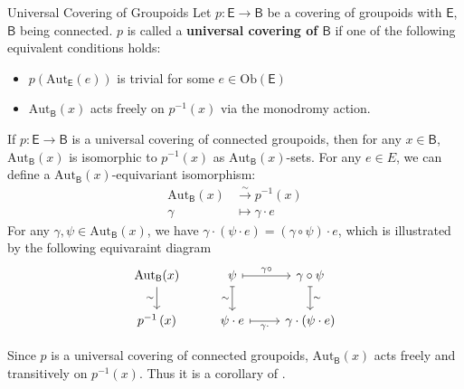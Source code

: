 \documentclass{report}
\begin{document}
\begin{definition}{Universal Covering of Groupoids}{}
	Let $p:\mathsf{E}\to \mathsf{B}$ be a covering of groupoids with $\mathsf{E}$, $\mathsf{B}$ being connected. $p$ is called a \textbf{universal covering of $\mathsf{B}$} if one of the following equivalent conditions holds:
	\begin{itemize}
		\item $p(\mathrm{Aut}_{\mathsf{E}}(e))$ is trivial for some $e\in \mathrm{Ob}(\mathsf{E})$
		\item $\mathrm{Aut}_{\mathsf{B}}(x)$ acts freely on $p^{-1}(x)$ via the monodromy action.
	\end{itemize}
\end{definition}

\begin{proposition}{}{}
	If $p:\mathsf{E}\to \mathsf{B}$ is a universal covering of connected groupoids, then for any $x\in \mathsf{B}$, $\mathrm{Aut}_{\mathsf{B}}(x)$ is isomorphic to $ p^{-1}(x)$ as $\mathrm{Aut}_{\mathsf{B}}(x)$-sets. For any $e\in E$, we can define a $\mathrm{Aut}_{\mathsf{B}}(x)$-equivariant isomorphism:
	\begin{align*}
		\mathrm{Aut}_{\mathsf{B}}(x) & \stackrel{\sim}{\longrightarrow} p^{-1}(x)
		\\
		\gamma                       & \longmapsto \gamma\cdot e
	\end{align*}
	For any $\gamma,\psi\in \mathrm{Aut}_{\mathsf{B}}(x)$, we have $\gamma\cdot(\psi\cdot e)=(\gamma\circ \psi)\cdot e$, which is illustrated by the following equivaraint diagram
	\begin{equation*}
		\begin{tikzcd}[ampersand replacement=\&]
			\mathrm{Aut}_{\mathsf{B}}(x) \arrow[d, "{\sim}"'] \& \psi \arrow[d, mapsto , "{\sim}"'] \arrow[r, mapsto, "\gamma\circ "] \& \gamma\circ \psi  \arrow[d, mapsto, "{\sim}"] \\
			p^{-1}\left(x\right)\& \psi \cdot e \arrow[r, mapsto, "{\gamma\cdot }"'] \&\gamma\cdot(\psi\cdot e)
		\end{tikzcd}
	\end{equation*}
\end{proposition}

\begin{prf}
	Since $p$ is a universal covering of connected groupoids, $\mathrm{Aut}_{\mathsf{B}}(x)$ acts freely and transitively on $p^{-1}(x)$. Thus it is a corollary of .
\end{prf}
\end{document}

